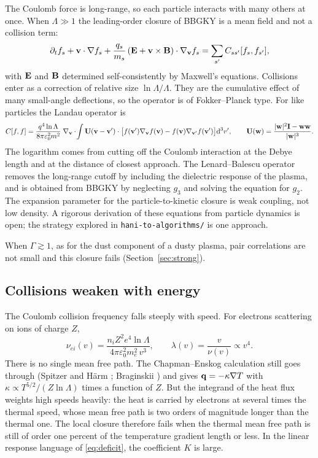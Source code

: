 The Coulomb force is long-range, so each particle interacts with many
others at once. When $\Lambda\gg1$ the leading-order closure of BBGKY is a
mean field and not a collision term:
\begin{equation}
  \partial_t f_s + \mathbf{v}\cdot\nabla f_s
  + \frac{q_s}{m_s}\left(\mathbf{E} + \mathbf{v}\times\mathbf{B}\right)\cdot\nabla_{\mathbf{v}} f_s
  = \sum_{s'}C_{ss'}[f_s,f_{s'}],
  \label{eq:vlasov-landau}
\end{equation}
with $\mathbf{E}$ and $\mathbf{B}$ determined self-consistently by Maxwell's equations.
Collisions enter as a correction of relative size $\ln\Lambda/\Lambda$.
They are the cumulative effect of many small-angle deflections, so the
operator is of Fokker--Planck type. For like particles the Landau operator
\cite{Landau36} is
\begin{equation}
  C[f,f]=\frac{q^4\ln\Lambda}{8\pi\varepsilon_0^2m^2}\;
  \nabla_{\mathbf{v}}\cdot\!\int\mathbf U(\mathbf{v}-\mathbf{v}')\cdot
  \bigl[f(\mathbf{v}')\nabla_{\mathbf{v}}f(\mathbf{v})-f(\mathbf{v})\nabla_{\mathbf{v}'}f(\mathbf{v}')\bigr]\mathrm{d}^3v',
  \qquad
  \mathbf U(\mathbf{w})=\frac{|\mathbf{w}|^2\mathbf I-\mathbf{w}\mathbf{w}}{|\mathbf{w}|^3}.
\end{equation}
The logarithm comes from cutting off the Coulomb interaction at the Debye
length and at the distance of closest approach. The Lenard--Balescu
operator \cite{Lenard60,Balescu60} removes the long-range cutoff by
including the dielectric response of the plasma, and is obtained from BBGKY
by neglecting $g_3$ and solving the equation for $g_2$. The expansion
parameter for the particle-to-kinetic closure is weak coupling, not low
density. A rigorous derivation of these equations from particle dynamics is
open; the strategy explored in \texttt{hani-to-algorithms/} is one
approach.

When $\Gamma\gtrsim1$, as for the dust component of a dusty plasma, pair
correlations are not small and this closure fails
(Section~\ref{sec:strong}).

\subsection{Collisions weaken with energy}
\label{sec:coulomb-tail}

The Coulomb collision frequency falls steeply with speed. For electrons
scattering on ions of charge $Z$,
\begin{equation}
  \nu_{ei}(v)=\frac{n_iZ^2e^4\ln\Lambda}{4\pi\varepsilon_0^2m_e^2\,v^3},
  \qquad
  \lambda(v)=\frac{v}{\nu(v)}\propto v^4 .
\end{equation}
There is no single mean free path. The Chapman--Enskog calculation still
goes through (Spitzer and H\"arm \cite{SH53}; Braginskii
\cite{Braginskii65}) and gives $\mathbf{q}=-\kappa\nabla T$ with
$\kappa\propto T^{5/2}/(Z\ln\Lambda)$ times a function of $Z$. But the
integrand of the heat flux weights high speeds heavily: the heat is carried
by electrons at several times the thermal speed, whose mean free path is
two orders of magnitude longer than the thermal one. The local closure
therefore fails when the thermal mean free path is still of order one
percent of the temperature gradient length or less. In the linear response
language of \eqref{eq:deficit}, the coefficient $K$ is large.

